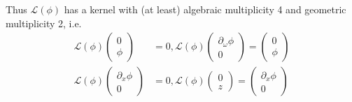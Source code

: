\documentclass[12pt]{article}
\def\calL{{\mathcal L}}
\begin{document}
Thus $\calL(\phi)$ has a kernel with (at least) algebraic multiplicity 4 and geometric multiplicity 2, i.e.
\begin{equation}\label{Lphikernel}
\begin{aligned}
\calL(\phi)\begin{pmatrix}0 \\ \phi \end{pmatrix} &= 0, 
\calL(\phi)\begin{pmatrix} \partial_\omega \phi \\ 0 \end{pmatrix} = \begin{pmatrix}0 \\ \phi \end{pmatrix} \\
\calL(\phi)\begin{pmatrix}\partial_x\phi \\ 0 \end{pmatrix} &= 0, 
\calL(\phi)\begin{pmatrix} 0 \\ z \end{pmatrix} = \begin{pmatrix}\partial_x\phi \\ 0 \end{pmatrix} 
\end{aligned}
\end{equation}
\end{document}
